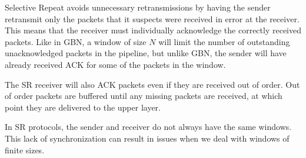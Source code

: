 \documentclass[12pt,letterpaper]{article}
\theoremstyle{definition}
\begin{document}
Selective Repeat avoids unnecessary retransmissions by having the sender retransmit only the packets that it suspects were received in error at the receiver. This means that the receiver must individually acknowledge the correctly received packets. Like in GBN, a window of size $N$ will limit the number of outstanding unacknowledged packets in the pipeline, but unlike GBN, the sender will have already received ACK for some of the packets in the window.

The SR receiver will also ACK packets even if they are received out of order. Out of order packets are buffered until any missing packets are received, at which point they are delivered to the upper layer.

In SR protocols, the sender and receiver do not always have the same windows. This lack of synchronization can result in issues when we deal with windows of finite sizes.
\end{document}
